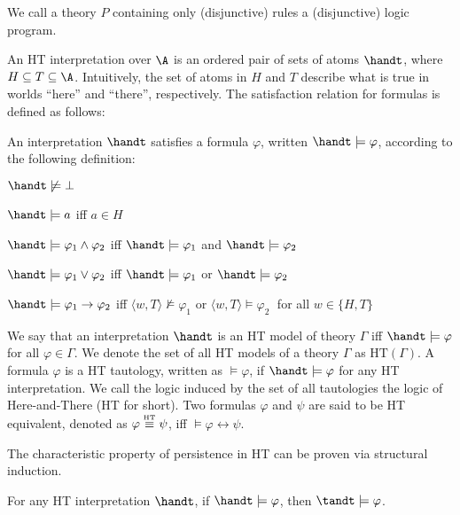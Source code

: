 We call a theory $P$ containing only (disjunctive) rules a
(disjunctive) logic program.

An HT interpretation over $\A$ is an ordered pair of sets of atoms
$\handt$, where $H \subseteq T \subseteq \A$. Intuitively, the set of
atoms in $H$ and $T$ describe what is true in worlds ``here'' and
``there'', respectively. The satisfaction relation for formulas is
defined as follows:

\begin{definition}[HT satisfaction]
    An interpretation $\handt$ satisfies a formula $\varphi$, written $\handt \models \varphi$, according to the following definition:
    \begin{description}
        \item $\handt \not \models \bot$
        \item $\handt \models a$ iff $a\in H$
        \item $\handt \models \varphi_1 \wedge \varphi_2$ iff $\handt \models \varphi_1$ and  $\handt \models \varphi_2$
        \item $\handt \models \varphi_1 \vee \varphi_2$ iff $\handt \models \varphi_1$ or  $\handt \models \varphi_2$
        \item $\handt \models \varphi_1 \to \varphi_2$ iff $\langle w,T \rangle \not \models \varphi_1$ or  $\langle w,T \rangle \models \varphi_2\;$ for all 
        $w \in \{H,T\}$
    \end{description}
\end{definition}

We say that an interpretation $\handt$ is an HT model of theory
$\Gamma$ iff $\handt \models \varphi$ for all $\varphi \in \Gamma$. We
denote the set of all HT models of a theory $\Gamma$ as
$\text{HT}(\Gamma)$. A formula $\varphi$ is a HT tautology, written as
$\models \varphi$, if $\handt \models \varphi$ for any HT
interpretation. We call the logic induced by the set of all
tautologies the logic of Here-and-There (HT for short). Two formulas
$\varphi$ and $\psi$ are said to be HT equivalent, denoted as
$\varphi \stackrel{\normalfont\mbox{\tiny HT}}{\equiv} \psi$, iff $\models \varphi \leftrightarrow \psi$.

The characteristic property of persistence in HT can be proven via
structural induction.

\begin{proposition}[Persistence]
  For any HT interpretation $\handt$, if $\handt \models \varphi$,
  then $\tandt \models \varphi$.
\end{proposition}



